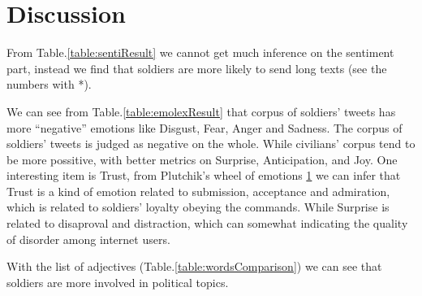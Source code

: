 \section{Discussion}

From Table.\ref{table:sentiResult} we cannot get much inference on the sentiment part, instead we find that soldiers are more likely to send long texts (see the numbers with *).

We can see from Table.\ref{table:emolexResult} that corpus of soldiers' tweets has more \enquote{negative} emotions like Disgust, Fear, Anger and Sadness. The corpus of soldiers' tweets is judged as negative on the whole. While civilians' corpus tend to be more possitive, with better metrics on Surprise, Anticipation, and Joy. One interesting item is Trust, from Plutchik’s wheel of emotions \ref{} we can infer that Trust is a kind of emotion related to submission, acceptance and admiration, which is related to soldiers' loyalty obeying the commands. While Surprise is related to disaproval and distraction, which can somewhat indicating the quality of disorder among internet users.

With the list of adjectives (Table.\ref{table:wordsComparison}) we can see that soldiers are more involved in political topics.
